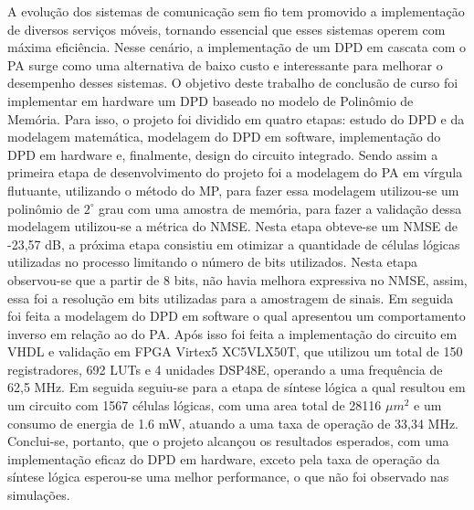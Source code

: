 A evolução dos sistemas de comunicação sem fio tem promovido a implementação de diversos serviços móveis, tornando essencial que esses sistemas operem com máxima eficiência. Nesse cenário, a implementação de um DPD em cascata com o PA surge como uma alternativa de baixo custo e interessante para melhorar o desempenho desses sistemas.
O objetivo deste trabalho de conclusão de curso foi implementar em hardware um DPD baseado no modelo de Polinômio de Memória. Para isso, o projeto foi dividido em quatro etapas: estudo do DPD e da modelagem matemática, modelagem do DPD em software, implementação do DPD em hardware e, finalmente, design do circuito integrado.
Sendo assim a primeira etapa de desenvolvimento do projeto foi a modelagem do PA em vírgula flutuante, utilizando o método do MP, para fazer essa modelagem utilizou-se um polinômio de $2^\circ$ grau com uma amostra de memória, para fazer a validação dessa modelagem utilizou-se a métrica do NMSE. Nesta etapa obteve-se um NMSE de -23,57 dB, a próxima etapa consistiu em otimizar a quantidade de células lógicas utilizadas no processo limitando o número de bits utilizados. Nesta etapa observou-se que a partir de 8 bits, não havia melhora expressiva no NMSE, assim, essa foi a resolução em bits utilizadas para a amostragem de sinais. Em seguida foi feita a modelagem do DPD em software o qual apresentou um comportamento inverso em relação ao do PA. Após isso foi feita a implementação do circuito em VHDL e validação em FPGA Virtex5 XC5VLX50T, que utilizou um total de 150 registradores, 692 LUTs e 4 unidades DSP48E, operando a uma frequência de 62,5 MHz. Em seguida seguiu-se para a etapa de síntese lógica a qual resultou em um circuito com 1567 células lógicas, com uma area total de 28116 $\mu m^2$ e um consumo de energia de 1.6 mW, atuando a uma taxa de operação de 33,34 MHz. Conclui-se, portanto, que o projeto alcançou os resultados esperados, com uma implementação eficaz do DPD em hardware, exceto pela taxa de operação da síntese lógica esperou-se uma melhor performance, o que não foi observado nas simulações.